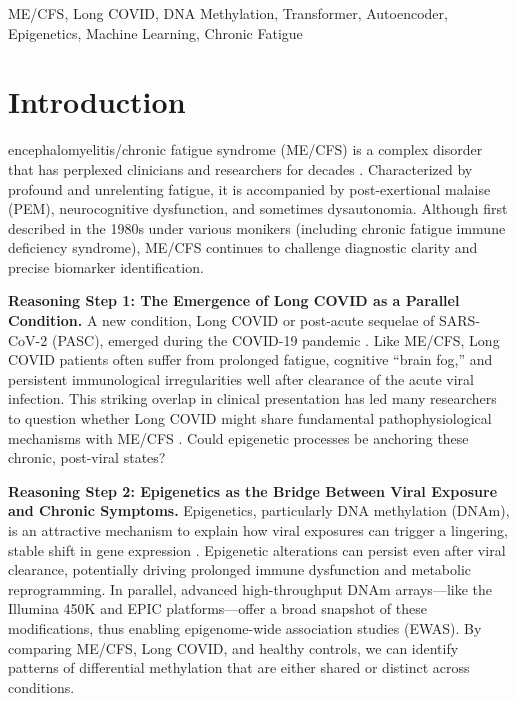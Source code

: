\documentclass[journal]{IEEEtran}
\begin{document}
\begin{IEEEkeywords}
ME/CFS, Long COVID, DNA Methylation, Transformer, Autoencoder, Epigenetics, Machine Learning, Chronic Fatigue
\end{IEEEkeywords}

\section{Introduction}\label{sec:intro}
 encephalomyelitis/chronic fatigue syndrome (ME/CFS) is a complex disorder that has perplexed clinicians and researchers for decades \cite{Apostolou2024reprogramming}. Characterized by profound and unrelenting fatigue, it is accompanied by post-exertional malaise (PEM), neurocognitive dysfunction, and sometimes dysautonomia. Although first described in the 1980s under various monikers (including chronic fatigue immune deficiency syndrome), ME/CFS continues to challenge diagnostic clarity and precise biomarker identification.

\vspace{0.5em}
\noindent\textbf{Reasoning Step 1: The Emergence of Long COVID as a Parallel Condition.} 
A new condition, Long COVID or post-acute sequelae of SARS-CoV-2 (PASC), emerged during the COVID-19 pandemic \cite{Davis2023longCOVID}. Like ME/CFS, Long COVID patients often suffer from prolonged fatigue, cognitive “brain fog,” and persistent immunological irregularities well after clearance of the acute viral infection. This striking overlap in clinical presentation has led many researchers to question whether Long COVID might share fundamental pathophysiological mechanisms with ME/CFS \cite{Balnis2022persistent}. Could epigenetic processes be anchoring these chronic, post-viral states?

\vspace{0.5em}
\noindent\textbf{Reasoning Step 2: Epigenetics as the Bridge Between Viral Exposure and Chronic Symptoms.} 
Epigenetics, particularly DNA methylation (DNAm), is an attractive mechanism to explain how viral exposures can trigger a lingering, stable shift in gene expression \cite{Bejaoui2023epigeneticAge}. Epigenetic alterations can persist even after viral clearance, potentially driving prolonged immune dysfunction and metabolic reprogramming. In parallel, advanced high-throughput DNAm arrays—like the Illumina 450K and EPIC platforms—offer a broad snapshot of these modifications, thus enabling epigenome-wide association studies (EWAS). By comparing ME/CFS, Long COVID, and healthy controls, we can identify patterns of differential methylation that are either shared or distinct across conditions.
\end{document}

